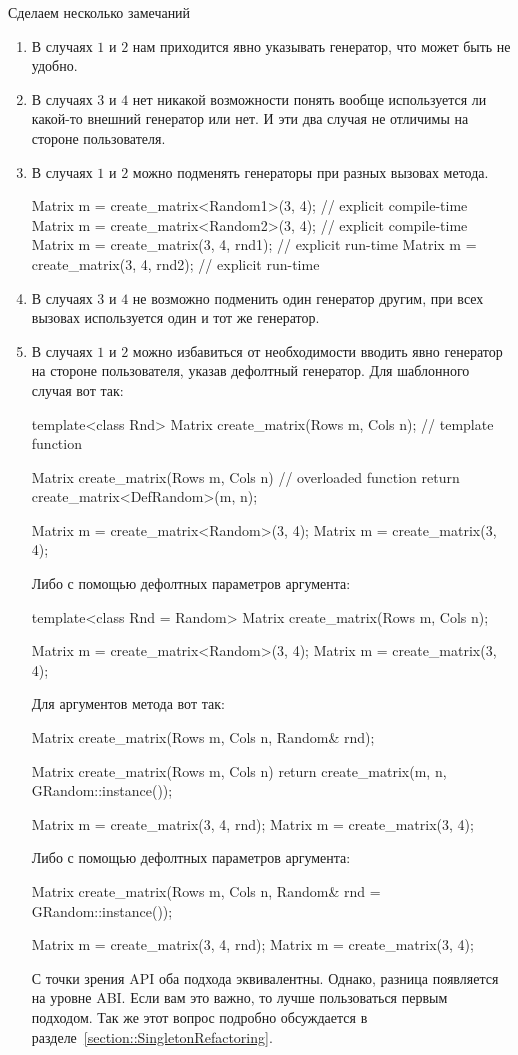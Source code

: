 Сделаем несколько замечаний
\begin{enumerate}
\item В случаях $1$ и $2$ нам приходится явно указывать генератор, что может быть не удобно.

\item В случаях $3$ и $4$ нет никакой возможности понять вообще используется ли какой-то внешний  генератор или нет.
И эти два случая не отличимы на стороне пользователя.

\item В случаях $1$ и $2$ можно подменять генераторы при разных вызовах метода.
\begin{cppcode}
Matrix m = create_matrix<Random1>(3, 4); // explicit compile-time
Matrix m = create_matrix<Random2>(3, 4); // explicit compile-time
Matrix m = create_matrix(3, 4, rnd1);    // explicit run-time
Matrix m = create_matrix(3, 4, rnd2);    // explicit run-time
\end{cppcode}

\item В случаях $3$ и $4$ не возможно подменить один генератор другим, при всех вызовах используется один и тот же генератор.

\item В случаях $1$ и $2$ можно избавиться от необходимости вводить явно генератор на стороне пользователя, указав дефолтный генератор.
Для шаблонного случая вот так:
\begin{cppcode}
template<class Rnd>
Matrix create_matrix(Rows m, Cols n);  // template function

Matrix create_matrix(Rows m, Cols n) { // overloaded function
  return create_matrix<DefRandom>(m, n);
}

Matrix m = create_matrix<Random>(3, 4);
Matrix m = create_matrix(3, 4);
\end{cppcode}
Либо с помощью дефолтных параметров аргумента:
\begin{cppcode}
template<class Rnd = Random>
Matrix create_matrix(Rows m, Cols n);

Matrix m = create_matrix<Random>(3, 4);
Matrix m = create_matrix(3, 4);
\end{cppcode}
Для аргументов метода вот так:
\begin{cppcode}
Matrix create_matrix(Rows m, Cols n, Random& rnd);

Matrix create_matrix(Rows m, Cols n) {
  return create_matrix(m, n, GRandom::instance());
}

Matrix m = create_matrix(3, 4, rnd);
Matrix m = create_matrix(3, 4);
\end{cppcode}
Либо с помощью дефолтных параметров аргумента:
\begin{cppcode}
Matrix create_matrix(Rows m, Cols n, Random& rnd = GRandom::instance());

Matrix m = create_matrix(3, 4, rnd);
Matrix m = create_matrix(3, 4);
\end{cppcode}
С точки зрения API оба подхода эквивалентны.
Однако, разница появляется на уровне ABI.
Если вам это важно, то лучше пользоваться первым подходом.
Так же этот вопрос подробно обсуждается в разделе~\ref{section::SingletonRefactoring}.
\end{enumerate}
